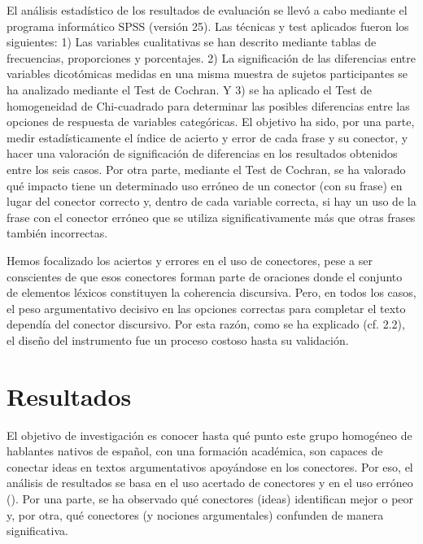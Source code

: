 \documentclass[spanish]{textolivre}
\begin{document}
El análisis estadístico de los resultados de evaluación se llevó a cabo mediante el programa informático SPSS (versión 25). Las técnicas y test aplicados fueron los siguientes: 1) Las variables cualitativas se han descrito mediante tablas de frecuencias, proporciones y porcentajes. 2) La significación de las diferencias entre variables dicotómicas medidas en una misma muestra de sujetos participantes se ha analizado mediante el Test de Cochran. Y 3) se ha aplicado el Test de homogeneidad de Chi-cuadrado para determinar las posibles diferencias entre las opciones de respuesta de variables categóricas. El objetivo ha sido, por una parte, medir estadísticamente el índice de acierto y error de cada frase y su conector, y hacer una valoración de significación de diferencias en los resultados obtenidos entre los seis casos. Por otra parte, mediante el Test de Cochran, se ha valorado qué impacto tiene un determinado uso erróneo de un conector (con su frase) en lugar del conector correcto y, dentro de cada variable correcta, si hay un uso de la frase con el conector erróneo que se utiliza significativamente más que otras frases también incorrectas.

Hemos focalizado los aciertos y errores en el uso de conectores, pese a ser conscientes de que esos conectores forman parte de oraciones donde el conjunto de elementos léxicos constituyen la coherencia discursiva. Pero, en todos los casos, el peso argumentativo decisivo en las opciones correctas para completar el texto dependía del conector discursivo. Por esta razón, como se ha explicado (cf. 2.2), el diseño del instrumento fue un proceso costoso hasta su validación. 


\section{Resultados}

El objetivo de investigación es conocer hasta qué punto este grupo homogéneo de hablantes nativos de español, con una formación académica, son capaces de conectar ideas en textos argumentativos apoyándose en los conectores. Por eso, el análisis de resultados se basa en el uso acertado de conectores y en el uso erróneo (). Por una parte, se ha observado qué conectores (ideas) identifican mejor o peor y, por otra, qué conectores (y nociones argumentales) confunden de manera significativa.
\end{document}
